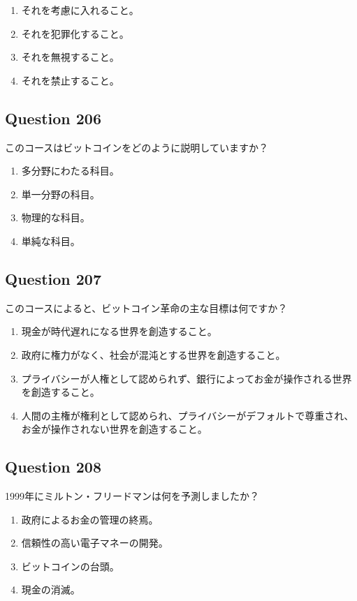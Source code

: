 \documentclass[12pt,a4paper]{article}
\begin{document}
\begin{enumerate}[label=\Alph*., leftmargin=*]
\item それを考慮に入れること。
\item それを犯罪化すること。
\item それを無視すること。
\item それを禁止すること。
\end{enumerate}

\bigskip


\subsection*{Question 206}
このコースはビットコインをどのように説明していますか？

\begin{enumerate}[label=\Alph*., leftmargin=*]
\item 多分野にわたる科目。
\item 単一分野の科目。
\item 物理的な科目。
\item 単純な科目。
\end{enumerate}

\bigskip


\subsection*{Question 207}
このコースによると、ビットコイン革命の主な目標は何ですか？

\begin{enumerate}[label=\Alph*., leftmargin=*]
\item 現金が時代遅れになる世界を創造すること。
\item 政府に権力がなく、社会が混沌とする世界を創造すること。
\item プライバシーが人権として認められず、銀行によってお金が操作される世界を創造すること。
\item 人間の主権が権利として認められ、プライバシーがデフォルトで尊重され、お金が操作されない世界を創造すること。
\end{enumerate}

\bigskip


\subsection*{Question 208}
1999年にミルトン・フリードマンは何を予測しましたか？

\begin{enumerate}[label=\Alph*., leftmargin=*]
\item 政府によるお金の管理の終焉。
\item 信頼性の高い電子マネーの開発。
\item ビットコインの台頭。
\item 現金の消滅。
\end{enumerate}
\end{document}
